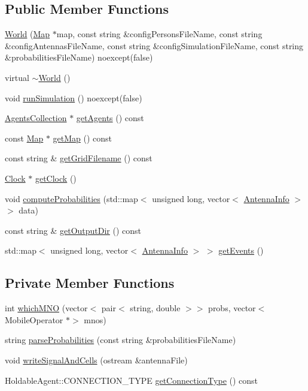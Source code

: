 \subsection*{Public Member Functions}
\begin{DoxyCompactItemize}
\item 
\hyperlink{class_world_adeb8454b3713d9dc1d05ca1f901e7b77}{World} (\hyperlink{class_map}{Map} $\ast$map, const string \&config\+Persons\+File\+Name, const string \&config\+Antennas\+File\+Name, const string \&config\+Simulation\+File\+Name, const string \&probabilities\+File\+Name) noexcept(false)
\item 
virtual \hyperlink{class_world_a9ce9875f5e35e293661857e4a2c1d2e4}{$\sim$\+World} ()
\item 
void \hyperlink{class_world_aa825a43f968c8fe750c67156e64721ff}{run\+Simulation} () noexcept(false)
\item 
\hyperlink{class_agents_collection}{Agents\+Collection} $\ast$ \hyperlink{class_world_a8cf8a54ae1f3cb61efeba2b3acebb7cc}{get\+Agents} () const
\item 
const \hyperlink{class_map}{Map} $\ast$ \hyperlink{class_world_a33b8543ee812ae4f8ff93329444da4cb}{get\+Map} () const
\item 
const string \& \hyperlink{class_world_a7d07b06f9884185161c5cc34034a7212}{get\+Grid\+Filename} () const
\item 
\hyperlink{class_clock}{Clock} $\ast$ \hyperlink{class_world_aa51e0799a58035305307e398a81ffeb2}{get\+Clock} ()
\item 
void \hyperlink{class_world_ad98b713484ef1c92ded7eec352a496a5}{compute\+Probabilities} (std\+::map$<$ unsigned long, vector$<$ \hyperlink{class_antenna_info}{Antenna\+Info} $>$$>$ data)
\item 
const string \& \hyperlink{class_world_a2830d2aea7d91f98257c1e661527289e}{get\+Output\+Dir} () const
\item 
std\+::map$<$ unsigned long, vector$<$ \hyperlink{class_antenna_info}{Antenna\+Info} $>$ $>$ \hyperlink{class_world_a65eab81f8a895b605cbc90d887d0671a}{get\+Events} ()
\end{DoxyCompactItemize}
\subsection*{Private Member Functions}
\begin{DoxyCompactItemize}
\item 
int \hyperlink{class_world_a9a982977a44c9e8a4724eaa1e4108679}{which\+M\+NO} (vector$<$ pair$<$ string, double $>$$>$ probs, vector$<$ Mobile\+Operator $\ast$$>$ mnos)
\item 
string \hyperlink{class_world_a5675c3a896891827dd59255a9761f08e}{parse\+Probabilities} (const string \&probabilities\+File\+Name)
\item 
void \hyperlink{class_world_a3f069fb694d8f17b23bda291bea47446}{write\+Signal\+And\+Cells} (ostream \&antenna\+File)
\item 
Holdable\+Agent\+::\+C\+O\+N\+N\+E\+C\+T\+I\+O\+N\+\_\+\+T\+Y\+PE \hyperlink{class_world_a35aafc469b9146b4b6f72c6adaa3e067}{get\+Connection\+Type} () const
\end{DoxyCompactItemize}

